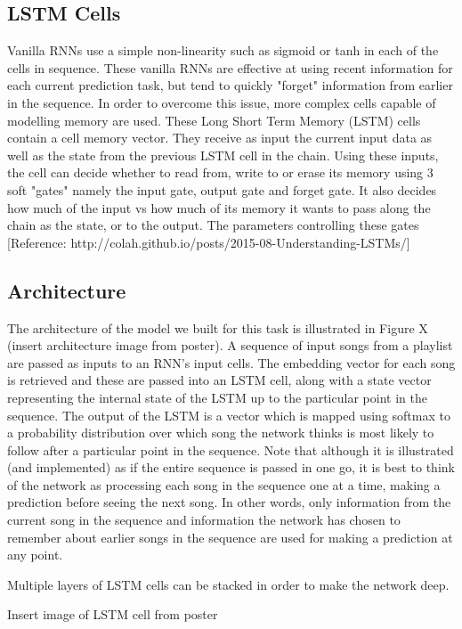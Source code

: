 \documentclass{article} %
\begin{document}
\subsection{LSTM Cells}
Vanilla RNNs use a simple non-linearity such as sigmoid or tanh in each of the cells in sequence. These vanilla RNNs are effective at using recent information for each current prediction task, but tend to quickly "forget" information from earlier in the sequence. In order to overcome this issue, more complex cells capable of modelling memory are used. These Long Short Term Memory (LSTM) cells contain a cell memory vector. They receive as input the current input data as well as the state from the previous LSTM cell in the chain. Using these inputs, the cell can decide whether to read from, write to or erase its memory using 3 soft "gates" namely the input gate, output gate and forget gate. It also decides how much of the input vs how much of its memory it wants to pass along the chain as the state, or to the output. The parameters controlling these gates 
 [Reference: http://colah.github.io/posts/2015-08-Understanding-LSTMs/]

\subsection{Architecture}
The architecture of the model we built for this task is illustrated in Figure X (insert architecture image from poster). A sequence of input songs from a playlist are passed as inputs to an RNN's input cells. The embedding vector for each song is retrieved and these are passed into an LSTM cell, along with a state vector representing the internal state of the LSTM up to the particular point in the sequence. The output of the LSTM is a vector which is mapped using softmax to a probability distribution over which song the network thinks is most likely to follow after a particular point in the sequence. Note that although it is illustrated (and implemented) as if the entire sequence is passed in one go, it is best to think of the network as processing each song in the sequence one at a time, making a prediction before seeing the next song. In other words, only information from the current song in the sequence and information the network has chosen to remember about earlier songs in the sequence are used for making a prediction at any point.  

Multiple layers of LSTM cells can be stacked in order to make the network deep. 

Insert image of LSTM cell from poster
\end{document}
